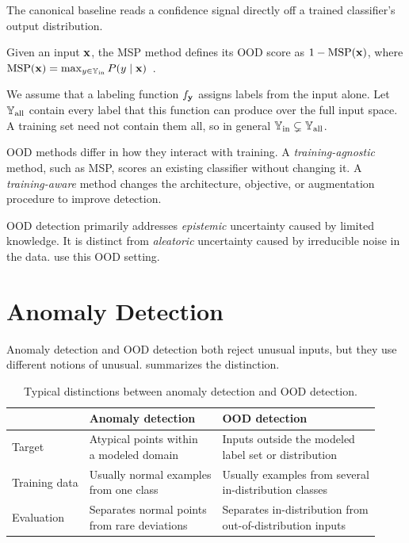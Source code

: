 The canonical baseline reads a confidence signal directly off a trained
classifier's output distribution.

\begin{method}
Given an input ${\mathbf{x}}$, the MSP method defines its OOD score as
$1-\mathrm{MSP}({\mathbf{x}})$, where
$\mathrm{MSP}({\mathbf{x}}) = \max_{y \in {\mathbb{Y}}_{\text{in}}} P(y \mid {\mathbf{x}})$~\citep{hendrycks2016baseline}.
\label{method:bg:msp}
\end{method}

We assume that a labeling function $f_{{\mathbf{y}}}$ assigns labels from the input alone.
Let ${\mathbb{Y}}_{\text{all}}$ contain every label that this function can produce over the
full input space. A training set need not contain them all, so in general
${\mathbb{Y}}_{\text{in}} \subsetneq {\mathbb{Y}}_{\text{all}}$.

OOD methods differ in how they interact with training. A
\emph{training-agnostic} method, such as MSP, scores an existing classifier without
changing it. A \emph{training-aware} method changes the architecture, objective, or
augmentation procedure to improve detection.

OOD detection primarily addresses \emph{epistemic} uncertainty caused by limited
knowledge. It is distinct from \emph{aleatoric} uncertainty caused by irreducible
noise in the data.  use
this OOD setting.

\section{Anomaly Detection}
\label{sec:bg:anomaly}

Anomaly detection and OOD detection both reject unusual inputs, but they use
different notions of unusual.  summarizes the distinction.

\begin{table}[H]
  \centering
  \caption{Typical distinctions between anomaly detection and OOD detection.}
  \label{tab:bg:anomaly-ood}
  \begin{tabular}{@{}lll@{}}
    \toprule
    & \textbf{Anomaly detection} & \textbf{OOD detection} \\
    \midrule
    Target
      & \shortstack[l]{Atypical points within\\a modeled domain}
      & \shortstack[l]{Inputs outside the modeled\\label set or distribution} \\
    Training data
      & \shortstack[l]{Usually normal examples\\from one class}
      & \shortstack[l]{Usually examples from several\\in-distribution classes} \\
    Evaluation
      & \shortstack[l]{Separates normal points\\from rare deviations}
      & \shortstack[l]{Separates in-distribution from\\out-of-distribution inputs} \\
    \bottomrule
  \end{tabular}
\end{table}


